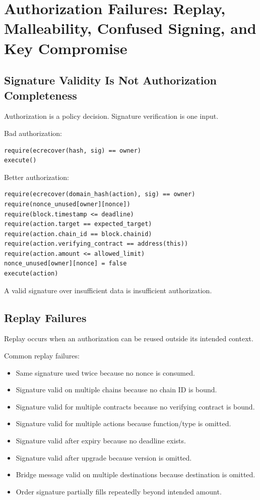 \section{Authorization Failures: Replay, Malleability, Confused Signing, and Key Compromise}

\subsection{Signature Validity Is Not Authorization Completeness}

Authorization is a policy decision. Signature verification is one input.

Bad authorization:

\begin{lstlisting}
require(ecrecover(hash, sig) == owner)
execute()
\end{lstlisting}

Better authorization:

\begin{lstlisting}
require(ecrecover(domain_hash(action), sig) == owner)
require(nonce_unused[owner][nonce])
require(block.timestamp <= deadline)
require(action.target == expected_target)
require(action.chain_id == block.chainid)
require(action.verifying_contract == address(this))
require(action.amount <= allowed_limit)
nonce_unused[owner][nonce] = false
execute(action)
\end{lstlisting}

A valid signature over insufficient data is insufficient authorization.

\subsection{Replay Failures}

Replay occurs when an authorization can be reused outside its intended
context.

Common replay failures:

\begin{itemize}
\tightlist
\item
  Same signature used twice because no nonce is consumed.
\item
  Signature valid on multiple chains because no chain ID is bound.
\item
  Signature valid for multiple contracts because no verifying contract
  is bound.
\item
  Signature valid for multiple actions because function/type is omitted.
\item
  Signature valid after expiry because no deadline exists.
\item
  Signature valid after upgrade because version is omitted.
\item
  Bridge message valid on multiple destinations because destination is
  omitted.
\item
  Order signature partially fills repeatedly beyond intended amount.
\end{itemize}

